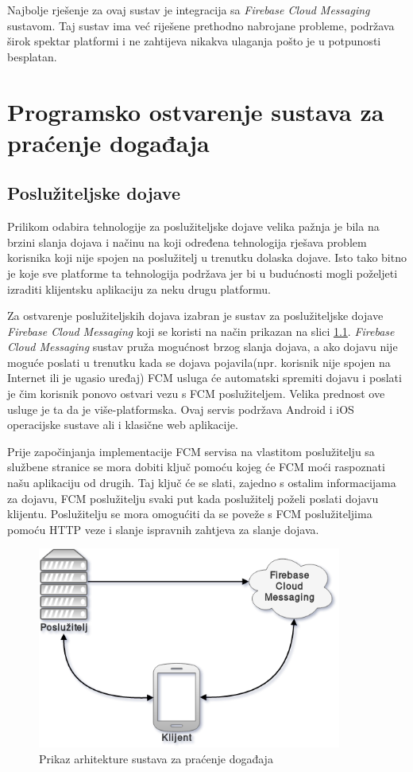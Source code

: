 \documentclass[times, utf8, zavrsni]{fer}
\begin{document}
{Najbolje rješenje za ovaj sustav je integracija sa {\em Firebase Cloud Messaging} sustavom. Taj sustav ima već riješene prethodno nabrojane probleme, podržava širok spektar platformi i ne zahtijeva nikakva ulaganja pošto je u potpunosti besplatan.

\chapter{Programsko ostvarenje sustava za praćenje događaja}
\label{chp:implementation}

\section{Poslužiteljske dojave}
Prilikom odabira tehnologije za poslužiteljske dojave velika pažnja je bila na brzini slanja dojava i načinu na koji određena tehnologija rješava problem korisnika koji nije spojen na poslužitelj u trenutku dolaska dojave. Isto tako bitno je koje sve platforme ta tehnologija podržava jer bi u budućnosti mogli poželjeti izraditi klijentsku aplikaciju za neku drugu platformu.

Za ostvarenje poslužiteljskih dojava izabran je sustav za poslužiteljske dojave {\em Firebase Cloud Messaging} koji se koristi na način prikazan na slici \ref{fig:architecture-image}. {\em Firebase Cloud Messaging} sustav pruža mogućnost brzog slanja dojava, a ako dojavu nije moguće poslati u trenutku kada se dojava pojavila(npr. korisnik nije spojen na Internet ili je ugasio uređaj) FCM usluga će automatski spremiti dojavu i poslati je čim korisnik ponovo ostvari vezu s FCM poslužiteljem. Velika prednost ove usluge je ta da je više-platformska. Ovaj servis podržava Android i iOS operacijske sustave ali i klasične web aplikacije.

Prije započinjanja implementacije FCM servisa na vlastitom poslužitelju sa službene stranice se mora dobiti ključ pomoću kojeg će FCM moći raspoznati našu aplikaciju od drugih. Taj ključ će se slati, zajedno s ostalim informacijama za dojavu, FCM poslužitelju svaki put kada poslužitelj poželi poslati dojavu klijentu. Poslužitelju se mora omogućiti da se poveže s FCM poslužiteljima pomoću HTTP veze i slanje ispravnih zahtjeva za slanje dojava.

\begin{figure}[htb]
\centering
\includegraphics[width=10cm]{img/architecture.png}
\caption{Prikaz arhitekture sustava za praćenje događaja}
\label{fig:architecture-image}
\end{figure}

}
\end{document}
